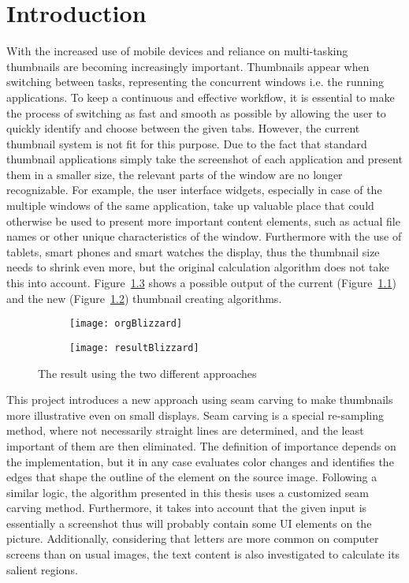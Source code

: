 \documentclass[draft,final]{vutinfth} %
\begin{document}
	\chapter{Introduction}
	With the increased use of mobile devices and reliance on multi-tasking thumbnails are becoming increasingly important.
	Thumbnails appear when switching between tasks, representing the concurrent windows i.e. the running applications.
	To keep a continuous and effective workflow, it is essential to make the process of switching as fast and smooth as possible by allowing the user to quickly identify and choose between the given tabs. 
	However, the current thumbnail system is not fit for this purpose. 
	Due to the fact that standard thumbnail applications simply take the screenshot of each application and present them in a smaller size, the relevant parts of the window are no longer recognizable. 
	For example, the user interface widgets, especially in case of the multiple windows of the same application, take up valuable place that could otherwise be used to present more important content elements, such as actual file names or other unique characteristics of the window.
	Furthermore with the use of tablets, smart phones and smart watches the display, thus the thumbnail size needs to shrink even more, but the original calculation algorithm does not take this into account.
	Figure~\ref{fig:introo} shows a possible output of the current (Figure~\ref{fig:introo:org}) and the new (Figure~\ref{fig:introo:res}) thumbnail creating algorithms.\par 
	\begin{figure}[h]
		\centering
		\begin{subfigure}[b]{0.45\columnwidth}
			\centering
			\texttt{[image: orgBlizzard]}
			\label{fig:introo:org}
		\end{subfigure}
		\begin{subfigure}[b]{0.45\columnwidth}
			\centering
			\texttt{[image: resultBlizzard]}
			\label{fig:introo:res}
		\end{subfigure}
		\caption{The result using the two different approaches}
		\label{fig:introo} %
	\end{figure}
	This project introduces a new approach using seam carving to make thumbnails more illustrative even on small displays.
	Seam carving is a special re-sampling method, where not necessarily straight lines are determined, and the least important of them are then eliminated.
	The definition of importance depends on the implementation, but it in any case evaluates color changes and identifies the edges that shape the outline of the element on the source image.
	Following a similar logic, the algorithm presented in this thesis uses a customized seam carving method.
	Furthermore, it takes into account that the given input is essentially a screenshot thus will probably contain some UI elements on the picture.
	Additionally, considering that letters are more common on computer screens than on usual images, the text content is also investigated to calculate its salient regions.
	
\end{document}
